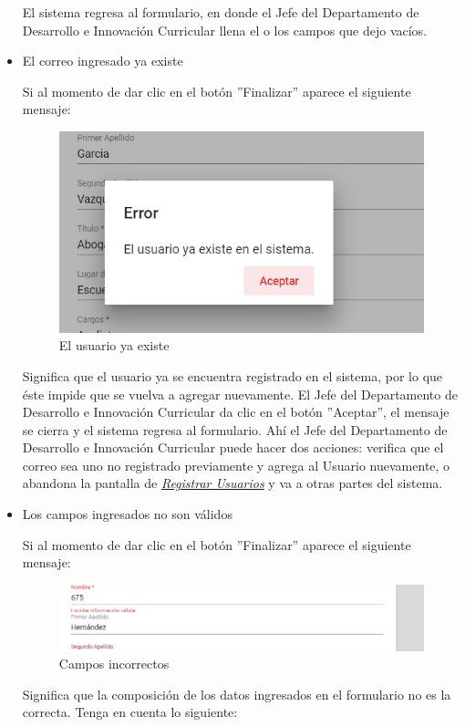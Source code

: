 \begin{itemize}
\begin{figure}[H]
	\end{figure}
	
	El sistema regresa  al formulario, en donde el Jefe del Departamento de Desarrollo e Innovación Curricular llena el o los campos que dejo vacíos.
	\item El correo ingresado ya existe
	
	Si al momento de dar clic en el botón ''Finalizar'' aparece el siguiente mensaje:
	
	\begin{figure}[H]
		\centering
		\includegraphics[width=0.4\linewidth]{images/SP5/MSG36}
		\caption{El usuario ya existe}
		\label{mensaje36-JDDIC}
		
	\end{figure}
	
	Significa que el usuario ya se encuentra registrado en el sistema, por lo que éste impide que se vuelva a agregar nuevamente. El Jefe del Departamento de Desarrollo e Innovación Curricular da clic en el botón ''Aceptar'', el mensaje se cierra y el sistema regresa al formulario. Ahí el Jefe del Departamento de Desarrollo e Innovación Curricular puede hacer dos acciones: verifica que el correo sea uno no registrado previamente y agrega al Usuario nuevamente, o abandona la pantalla de \hyperlink{registrarUs-JDDIC}{\textit{Registrar Usuarios}} y va a otras partes del sistema.
	
	\item Los campos ingresados no son válidos
	
	Si al momento de dar clic en el botón ''Finalizar'' aparece el siguiente mensaje:
	
	\begin{figure}[H]
		\centering
		\includegraphics[width=0.4\linewidth]{images/SP5/MSG35}
		\caption{Campos incorrectos}
		\label{mensaje35-JDDIC}
		
	\end{figure}
	
	
	Significa que la composición de los datos ingresados en el formulario no es la correcta. Tenga en cuenta lo siguiente:
	

\end{itemize}
